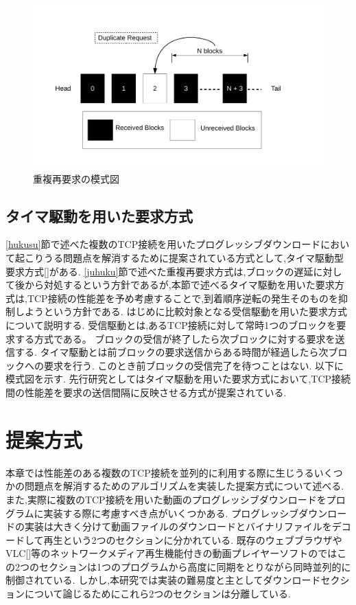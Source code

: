 \documentclass[a4j,12pt]{gradthesis_utf8}
\begin{document}
 \begin{figure}[h]
     \centering
     \includegraphics[width=18cm]{figure/block_dup.pdf}
     \caption{重複再要求の模式図}
     \label{blockdup}
 \end{figure}

\newpage
 
 
 \section{タイマ駆動を用いた要求方式}
 \ref{hukusu}節で述べた複数のTCP接続を用いたプログレッシブダウンロードにおいて起こりうる問題点を解消するために提案されている方式として,タイマ駆動型要求方式[]がある.
 \ref{juhuku}節で述べた重複再要求方式は,ブロックの遅延に対して後から対処するという方針であるが,本節で述べるタイマ駆動を用いた要求方式は,TCP接続の性能差を予め考慮することで,到着順序逆転の発生そのものを抑制しようという方針である.
 はじめに比較対象となる受信駆動を用いた要求方式について説明する.
 受信駆動とは,あるTCP接続に対して常時1つのブロックを要求する方式である。
 ブロックの受信が終了したら次ブロックに対する要求を送信する.
 タイマ駆動とは前ブロックの要求送信からある時間が経過したら次ブロックへの要求を行う.
 このとき前ブロックの受信完了を待つことはない.
 以下に模式図を示す.
 先行研究としてはタイマ駆動を用いた要求方式において,TCP接続間の性能差を要求の送信間隔に反映させる方式が提案されている.
 
\chapter{提案方式}\label{sec:sec3}
本章では性能差のある複数のTCP接続を並列的に利用する際に生じうるいくつかの問題点を解消するためのアルゴリズムを実装した提案方式について述べる.
また,実際に複数のTCP接続を用いた動画のプログレッシブダウンロードをプログラムに実装する際に考慮すべき点がいくつかある.
プログレッシブダウンロードの実装は大きく分けて動画ファイルのダウンロードとバイナリファイルをデコードして再生という2つのセクションに分かれている.
既存のウェブブラウザやVLC[]等のネットワークメディア再生機能付きの動画プレイヤーソフトのではこの2つのセクションは1つのプログラムから高度に同期をとりながら同時並列的に制御されている.
しかし,本研究では実装の難易度と主としてダウンロードセクションについて論じるためにこれら2つのセクションは分離している.
\end{document}
